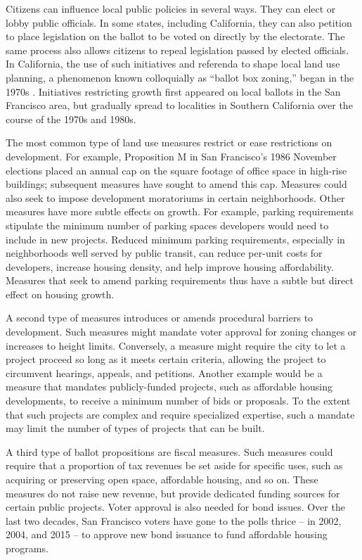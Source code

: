\documentclass[article,11pt]{memoir}
\begin{document}
Citizens can influence local public policies in several ways.  They can elect or lobby public officials.  In some states, including California, they can also petition to place legislation on the ballot to be voted on directly by the electorate.  The same process also allows citizens to repeal legislation passed by elected officials.  In California, the use of such initiatives and referenda to shape local land use planning, a phenomenon known colloquially as ``ballot box zoning,'' began in the 1970s \cite[p.244]{fulton_guide_2012}.  Initiatives restricting growth first appeared on local ballots in the San Francisco area, but gradually spread to localities in Southern California over the course of the 1970s and 1980s.

The most common type of land use measures restrict or ease restrictions on development.  For example, Proposition M in San Francisco's 1986 November elections placed an annual cap on the square footage of office space in high-rise buildings; subsequent measures have sought to amend this cap.  Measures could also seek to impose development moratoriums in certain neighborhoods.  Other measures have more subtle effects on growth. For example, parking requirements stipulate the minimum number of parking spaces developers would need to include in new projects. Reduced minimum parking requirements, especially in neighborhoods well served by public transit, can reduce per-unit costs for developers, increase housing density, and help improve housing affordability. Measures that seek to amend parking requirements thus have a subtle but direct effect on housing growth.

A second type of measures introduces or amends procedural barriers to development. Such measures might mandate voter approval for zoning changes or increases to height limits.  Conversely, a measure might require the city to let a project proceed so long as it meets certain criteria, allowing the project to circumvent hearings, appeals, and petitions.  Another example would be a measure that mandates publicly-funded projects, such as affordable housing developments, to receive a minimum number of bids or proposals. To the extent that such projects are complex and require specialized expertise, such a mandate may limit the number of types of projects that can be built.

A third type of ballot propositions are fiscal measures. Such measures could require that a proportion of tax revenues be set aside for specific uses, such as acquiring or preserving open space, affordable housing, and so on.  These measures do not raise new revenue, but provide dedicated funding sources for certain public projects. Voter approval is also needed for bond issues. Over the last two decades, San Francisco voters have gone to the polls thrice -- in 2002, 2004, and 2015 -- to approve new bond issuance to fund affordable housing programs.
\end{document}
